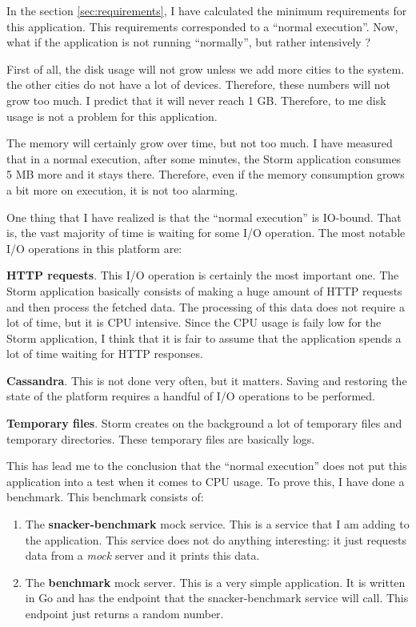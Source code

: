 In the section \ref{sec:requirements}, I have calculated the minimum
requirements for this application. This requirements corresponded to a ``normal
execution''. Now, what if the application is not running ``normally'', but
rather intensively ?

First of all, the disk usage will not grow unless we add more cities to the
system. the other cities do not have a lot of devices. Therefore, these numbers
will not grow too much. I predict that it will never reach 1 GB. Therefore, to
me disk usage is not a problem for this application.

The memory will certainly grow over time, but not too much. I have measured
that in a normal execution, after some minutes, the Storm application consumes
5 MB more and it stays there. Therefore, even if the memory consumption grows a
bit more on execution, it is not too alarming.

One thing that I have realized is that the ``normal execution'' is
IO-bound. That is, the vast majority of time is waiting for some I/O operation.
The most notable I/O operations in this platform are:

\mylist
  \item {\bf HTTP requests}. This I/O operation is certainly the most important
one. The Storm application basically consists of making a huge amount of HTTP
requests and then process the fetched data. The processing of this data does
not require a lot of time, but it is CPU intensive. Since the CPU usage is
faily low for the Storm application, I think that it is fair to assume that the
application spends a lot of time waiting for HTTP responses.
  \item {\bf Cassandra}. This is not done very often, but it matters. Saving
and restoring the state of the platform requires a handful of I/O operations to
be performed.
  \item {\bf Temporary files}. Storm creates on the background a lot of
temporary files and temporary directories. These temporary files are basically
logs.
\mylistend

This has lead me to the conclusion that the ``normal execution'' does not put
this application into a test when it comes to CPU usage. To prove this, I have
done a benchmark. This benchmark consists of:

\begin{enumerate}
  \item The {\bf snacker-benchmark} mock service. This is a service that I am
adding to the application. This service does not do anything interesting: it
just requests data from a {\it mock} server and it prints this data.
  \item The {\bf benchmark} mock server. This is a very simple application. It
is written in Go and has the endpoint that the snacker-benchmark service will
call. This endpoint just returns a random number.
\end{enumerate}

